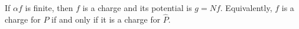 If $\alpha f$ is finite, then $f$ is a charge and its potential is $g = Nf$. Equivalently, $f$ is a charge for $P$ if and only if it is a charge for $\hat{P}$.
